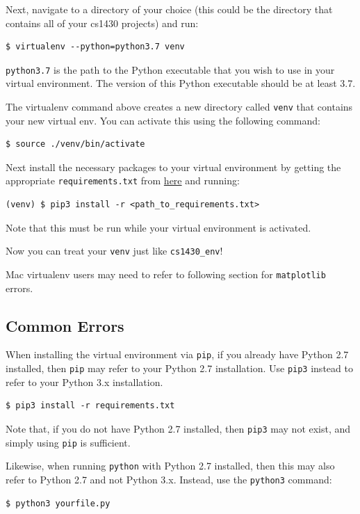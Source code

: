 \documentclass{article}
\begin{document}
Next, navigate to a directory of your choice (this could be the directory that contains all of your cs1430 projects) and run:
\begin{verbatim}
$ virtualenv --python=python3.7 venv
\end{verbatim}

\texttt{python3.7} is the path to the Python executable that you wish to use in your virtual environment. The version of this Python executable should be at least 3.7.

The virtualenv command above creates a new directory called \texttt{venv} that contains your new virtual env. You can activate this using the following command:
\begin{verbatim}
$ source ./venv/bin/activate
\end{verbatim}

Next install the necessary packages to your virtual environment by getting the appropriate \texttt{requirements.txt} from  \href{http://cs.brown.edu/courses/csci1430/gradescope/requirements.txt}{here} and running:
\begin{verbatim}
(venv) $ pip3 install -r <path_to_requirements.txt>
\end{verbatim}

Note that this must be run while your virtual environment is activated.

Now you can treat your \texttt{venv} just like \texttt{cs1430\_env}!

Mac virtualenv users may need to refer to following section for \texttt{matplotlib} errors.

\subsection{Common Errors}
When installing the virtual environment via \texttt{pip}, if you already have Python 2.7 installed, then \texttt{pip} may refer to your Python 2.7 installation. Use \texttt{pip3} instead to refer to your Python 3.x installation.
\begin{verbatim}
$ pip3 install -r requirements.txt
\end{verbatim}
Note that, if you do not have Python 2.7 installed, then \texttt{pip3} may not exist, and simply using \texttt{pip} is sufficient.

Likewise, when running \texttt{python} with Python 2.7 installed, then this may also refer to Python 2.7 and not Python 3.x. Instead, use the \texttt{python3} command:
\begin{verbatim}
$ python3 yourfile.py
\end{verbatim}
\end{document}
